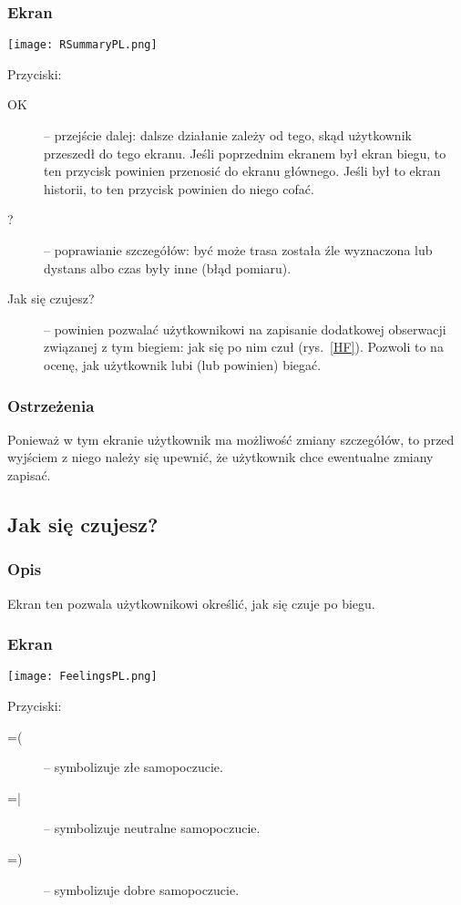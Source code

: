 \subsubsection{Ekran}
\begin{minipage}{0.5\textwidth}
  \label{RS}
  \texttt{[image: RSummaryPL.png]}
\end{minipage}
\begin{minipage}{0.5\textwidth}
Przyciski:\\
\begin{description}
  \item[OK] -- przejście dalej: dalsze działanie zależy od tego, skąd użytkownik przeszedł do tego ekranu. Jeśli poprzednim ekranem był ekran biegu, to ten przycisk powinien przenosić do ekranu głównego. Jeśli był to ekran historii, to ten przycisk powinien do niego cofać.
  \item[?] -- poprawianie szczegółów: być może trasa została źle wyznaczona lub dystans albo czas były inne (błąd pomiaru).
  \item[Jak się czujesz?] -- powinien pozwalać użytkownikowi na zapisanie dodatkowej obserwacji związanej z tym biegiem: jak się po nim czuł (rys.~\ref{HF}). Pozwoli to na ocenę, jak użytkownik lubi (lub powinien) biegać.
\end{description}
\end{minipage}
\subsubsection{Ostrzeżenia}
\noindent Ponieważ w tym ekranie użytkownik ma możliwość zmiany szczegółów, to przed wyjściem z niego należy się upewnić, że użytkownik chce ewentualne zmiany zapisać.
\subsection{Jak się czujesz?}
\subsubsection{Opis}
\noindent Ekran ten pozwala użytkownikowi określić, jak się czuje po biegu.
\subsubsection{Ekran}
\begin{minipage}{0.5\textwidth}
  \label{HF}
  \texttt{[image: FeelingsPL.png]}
\end{minipage}
\begin{minipage}{0.5\textwidth}
Przyciski:\\
\begin{description}
  \item[=(] -- symbolizuje złe samopoczucie.
  \item[=|] -- symbolizuje neutralne samopoczucie.
  \item[=)] -- symbolizuje dobre samopoczucie.
\end{description}
\end{minipage}

